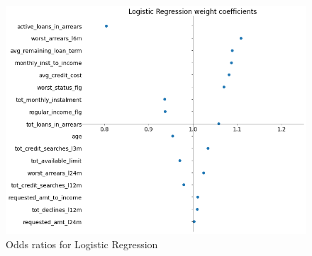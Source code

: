 \begin  {figure}[!htpb]
\centering
  \includegraphics[width=0.8\linewidth]{Credit_Images/LR_ODDS.png}
   \caption{Odds ratios for Logistic Regression}
    \label{fig-odds-lr}
\end{figure}


